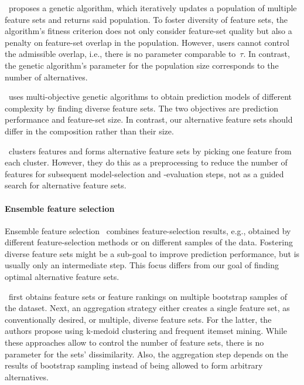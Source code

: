 \documentclass{article}
\theoremstyle{definition}
\begin{document}
\cite{siddiqi2020genetic}~proposes a genetic algorithm, which iteratively updates a population of multiple feature sets and returns said population.
To foster diversity of feature sets, the algorithm's fitness criterion does not only consider feature-set quality but also a penalty on feature-set overlap in the population.
However, users cannot control the admissible overlap, i.e., there is no parameter comparable to~$\tau$.
In contrast, the genetic algorithm's parameter for the population size corresponds to the number of alternatives.

\cite{emmanouilidis1999selecting}~uses multi-objective genetic algorithms to obtain prediction models of different complexity by finding diverse feature sets.
The two objectives are prediction performance and feature-set size.
In contrast, our alternative feature sets should differ in the composition rather than their size.

\cite{mueller2021feature}~clusters features and forms alternative feature sets by picking one feature from each cluster.
However, they do this as a preprocessing to reduce the number of features for subsequent model-selection and -evaluation steps, not as a guided search for alternative feature sets.

\paragraph{Ensemble feature selection}

Ensemble feature selection~\cite{saeys2008robust, seijo2017ensemble} combines feature-selection results, e.g., obtained by different feature-selection methods or on different samples of the data.
Fostering diverse feature sets might be a sub-goal to improve prediction performance, but is usually only an intermediate step.
This focus differs from our goal of finding optimal alternative feature sets.

\cite{woznica2012model}~first obtains feature sets or feature rankings on multiple bootstrap samples of the dataset.
Next, an aggregation strategy either creates a single feature set, as conventionally desired, or multiple, diverse feature sets.
For the latter, the authors propose using k-medoid clustering and frequent itemset mining.
While these approaches allow to control the number of feature sets, there is no parameter for the sets' dissimilarity.
Also, the aggregation step depends on the results of bootstrap sampling instead of being allowed to form arbitrary alternatives.
\end{document}
